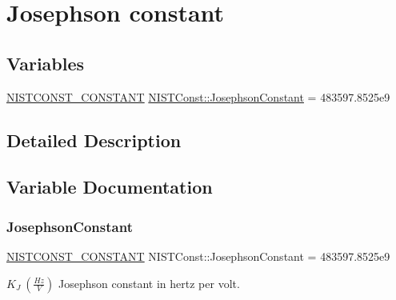 \hypertarget{group___n_i_s_t_const-_josephson_constant}{}\section{Josephson constant}
\label{group___n_i_s_t_const-_josephson_constant}
\subsection*{Variables}
\begin{DoxyCompactItemize}
\item 
\mbox{\hyperlink{group___n_i_s_t_const-_macros_ga2b0fc1d7452373f816175dd86ce26729}{N\+I\+S\+T\+C\+O\+N\+S\+T\+\_\+\+C\+O\+N\+S\+T\+A\+NT}} \mbox{\hyperlink{group___n_i_s_t_const-_josephson_constant_gacafbc0c823771554a6ae27245b48d134}{N\+I\+S\+T\+Const\+::\+Josephson\+Constant}} = 483597.\+8525e9
\end{DoxyCompactItemize}


\subsection{Detailed Description}


\subsection{Variable Documentation}
\mbox{\label{group___n_i_s_t_const-_josephson_constant_gacafbc0c823771554a6ae27245b48d134}} 
\subsubsection{\texorpdfstring{Josephson\+Constant}{JosephsonConstant}}
{\footnotesize\ttfamily \mbox{\hyperlink{group___n_i_s_t_const-_macros_ga2b0fc1d7452373f816175dd86ce26729}{N\+I\+S\+T\+C\+O\+N\+S\+T\+\_\+\+C\+O\+N\+S\+T\+A\+NT}} N\+I\+S\+T\+Const\+::\+Josephson\+Constant = 483597.\+8525e9}

$K_J \ (\frac{Hz}{V})$ Josephson constant in hertz per volt. 